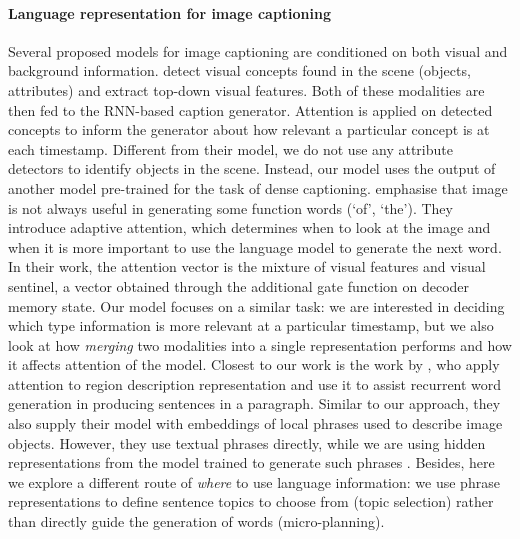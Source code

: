 \documentclass[11pt,a4paper]{article}
\begin{document}
\paragraph{Language representation for image captioning}
Several proposed models for image captioning are conditioned on both visual and background information.
 detect visual concepts found in the scene (objects, attributes) and extract top-down visual features.
Both of these modalities are then fed to the RNN-based caption generator.
Attention is applied on detected concepts to inform the generator about how relevant a particular concept is at each timestamp.
Different from their model, we do not use any attribute detectors to identify objects in the scene.
Instead, our model uses the output of another model pre-trained for the task of dense captioning.
 emphasise that image is not always useful in generating some function words (`of', `the').
They introduce adaptive attention, which determines when to look at the image and when it is more important to use the language model to generate the next word.
In their work, the attention vector is the mixture of visual features and visual sentinel, a vector obtained through the additional gate function on decoder memory state.
Our model focuses on a similar task: we are interested in deciding which type information is more relevant at a particular timestamp, but we also look at how \textit{merging} two modalities into a single representation performs and how it affects attention of the model.
Closest to our work is the work by , who apply attention to region description representation and use it to assist recurrent word generation in producing sentences in a paragraph.
Similar to our approach, they also supply their model with embeddings of local phrases used to describe image objects.
However, they use textual phrases directly, while we are using hidden representations from the model trained to generate such phrases \cite{densecap}.
Besides, here we explore a different route of \textit{where} to use language information: we use phrase representations to define sentence topics to choose from (topic selection) rather than directly guide the generation of words (micro-planning).
\end{document}

